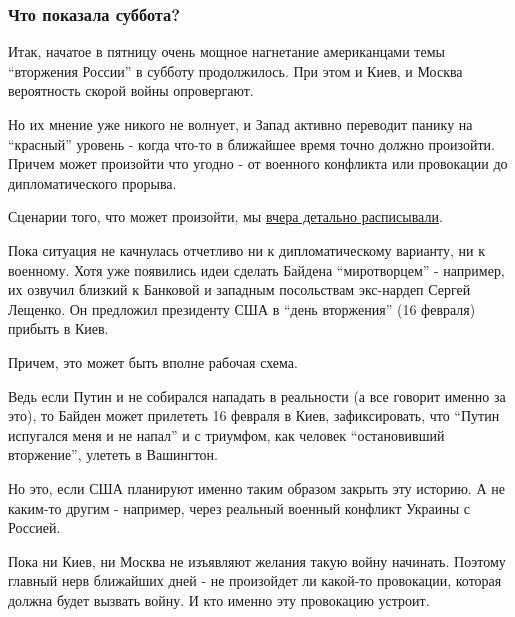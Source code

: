  
 
 
 
 

\subsubsection{Что показала суббота?}

Итак, начатое в пятницу очень мощное нагнетание американцами темы \enquote{вторжения
России} в субботу продолжилось. При этом и Киев, и Москва вероятность скорой
войны опровергают.

Но их мнение уже никого не волнует, и Запад активно переводит панику на
\enquote{красный} уровень - когда что-то в ближайшее время точно должно произойти.
Причем может произойти что угодно - от военного конфликта или провокации до
дипломатического прорыва. 

Сценарии того, что может произойти, мы \href{https://strana.news/news/376303-ssha-zajavili-chto-rossija-napadet-15-fevralja-chto-proiskhodit.html}{вчера детально расписывали}. 

Пока ситуация не качнулась отчетливо ни к дипломатическому варианту, ни к
военному. Хотя уже появились идеи сделать Байдена \enquote{миротворцем} -
например, их озвучил близкий к Банковой и западным посольствам экс-нардеп
Сергей Лещенко. Он предложил президенту США в \enquote{день вторжения} (16
февраля) прибыть в Киев. 

Причем, это может быть вполне рабочая схема.

Ведь если Путин и не собирался нападать в реальности (а все говорит именно за
это), то Байден может прилететь 16 февраля в Киев, зафиксировать, что
\enquote{Путин испугался меня и не напал} и с триумфом, как человек
\enquote{остановивший вторжение}, улететь в Вашингтон.

Но это, если США планируют именно таким образом закрыть эту историю. А не
каким-то другим - например, через реальный военный конфликт Украины с Россией. 

Пока ни Киев, ни Москва не изъявляют желания такую войну начинать. Поэтому
главный нерв ближайших дней - не произойдет ли какой-то провокации, которая
должна будет вызвать войну. И кто именно эту провокацию устроит.
